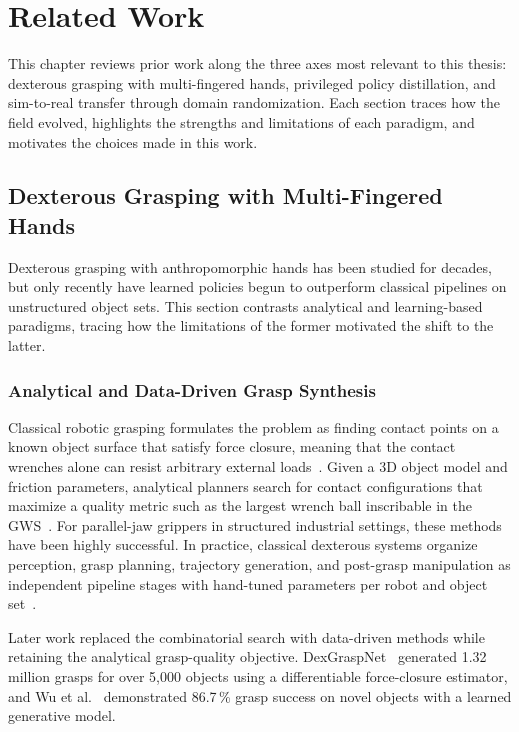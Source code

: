\chapter{Related Work}%
\label{ch:related_work}%

This chapter reviews prior work along the three axes most relevant to this thesis: dexterous grasping with multi-fingered hands, privileged policy distillation, and sim-to-real transfer through domain randomization.
Each section traces how the field evolved, highlights the strengths and limitations of each paradigm, and motivates the choices made in this work.

\section{Dexterous Grasping with Multi-Fingered Hands}%
\label{sec:dexterous_grasping}%

Dexterous grasping with anthropomorphic hands has been studied for decades, but only recently have learned policies begun to outperform classical pipelines on unstructured object sets.
This section contrasts analytical and learning-based paradigms, tracing how the limitations of the former motivated the shift to the latter.

\subsection{Analytical and Data-Driven Grasp Synthesis}%
\label{subsec:rule_based_grasping}%

Classical robotic grasping formulates the problem as finding contact points on a known object surface that satisfy force closure, meaning that the contact wrenches alone can resist arbitrary external loads~\cite{Bicchi2000, Ferrari1992}.
Given a 3D object model and friction parameters, analytical planners search for contact configurations that maximize a quality metric such as the largest wrench ball inscribable in the \ac{GWS}~\cite{Ferrari1992}.
For parallel-jaw grippers in structured industrial settings, these methods have been highly successful.
In practice, classical dexterous systems organize perception, grasp planning, trajectory generation, and post-grasp manipulation as independent pipeline stages with hand-tuned parameters per robot and object set~\cite{Bicchi2000, Siciliano2009}.

Later work replaced the combinatorial search with data-driven methods while retaining the analytical grasp-quality objective.
DexGraspNet~\cite{Wang2023} generated 1.32 million grasps for over 5{,}000 objects using a differentiable force-closure estimator, and Wu et al.~\cite{Wu2022} demonstrated 86.7\,\% grasp success on novel objects with a learned generative model.

